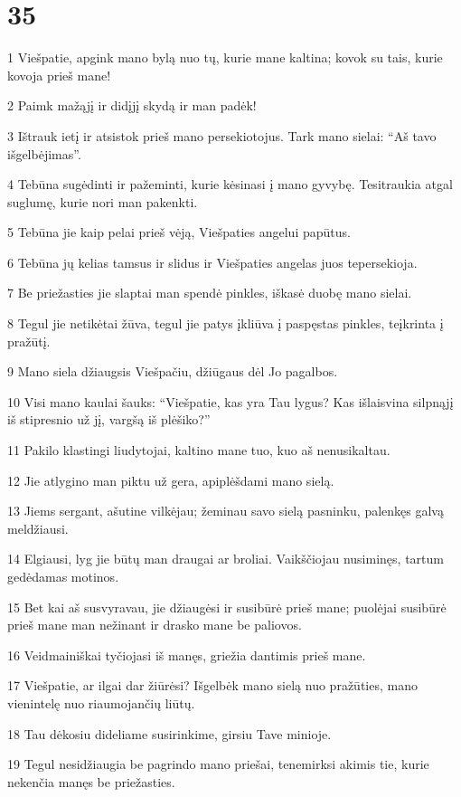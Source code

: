 \chapter{35}


\par 1 Viešpatie, apgink mano bylą nuo tų, kurie mane kaltina; kovok su tais, kurie kovoja prieš mane! 
\par 2 Paimk mažąjį ir didįjį skydą ir man padėk! 
\par 3 Ištrauk ietį ir atsistok prieš mano persekiotojus. Tark mano sielai: “Aš tavo išgelbėjimas”. 
\par 4 Tebūna sugėdinti ir pažeminti, kurie kėsinasi į mano gyvybę. Tesitraukia atgal suglumę, kurie nori man pakenkti. 
\par 5 Tebūna jie kaip pelai prieš vėją, Viešpaties angelui papūtus. 
\par 6 Tebūna jų kelias tamsus ir slidus ir Viešpaties angelas juos tepersekioja. 
\par 7 Be priežasties jie slaptai man spendė pinkles, iškasė duobę mano sielai. 
\par 8 Tegul jie netikėtai žūva, tegul jie patys įkliūva į paspęstas pinkles, teįkrinta į pražūtį. 
\par 9 Mano siela džiaugsis Viešpačiu, džiūgaus dėl Jo pagalbos. 
\par 10 Visi mano kaulai šauks: “Viešpatie, kas yra Tau lygus? Kas išlaisvina silpnąjį iš stipresnio už jį, vargšą iš plėšiko?” 
\par 11 Pakilo klastingi liudytojai, kaltino mane tuo, kuo aš nenusikaltau. 
\par 12 Jie atlygino man piktu už gera, apiplėšdami mano sielą. 
\par 13 Jiems sergant, ašutine vilkėjau; žeminau savo sielą pasninku, palenkęs galvą meldžiausi. 
\par 14 Elgiausi, lyg jie būtų man draugai ar broliai. Vaikščiojau nusiminęs, tartum gedėdamas motinos. 
\par 15 Bet kai aš susvyravau, jie džiaugėsi ir susibūrė prieš mane; puolėjai susibūrė prieš mane man nežinant ir drasko mane be paliovos. 
\par 16 Veidmainiškai tyčiojasi iš manęs, griežia dantimis prieš mane. 
\par 17 Viešpatie, ar ilgai dar žiūrėsi? Išgelbėk mano sielą nuo pražūties, mano vienintelę nuo riaumojančių liūtų. 
\par 18 Tau dėkosiu dideliame susirinkime, girsiu Tave minioje. 
\par 19 Tegul nesidžiaugia be pagrindo mano priešai, tenemirksi akimis tie, kurie nekenčia manęs be priežasties. 
